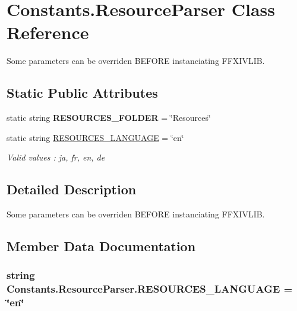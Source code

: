 \hypertarget{class_constants_1_1_resource_parser}{\section{Constants.\-Resource\-Parser Class Reference}
\label{class_constants_1_1_resource_parser}
}


Some parameters can be overriden B\-E\-F\-O\-R\-E instanciating F\-F\-X\-I\-V\-L\-I\-B.  


\subsection*{Static Public Attributes}
\begin{DoxyCompactItemize}
\item 
\hypertarget{class_constants_1_1_resource_parser_ac3c9afd0c2716bc70ee1f601d0571ada}{static string {\bfseries R\-E\-S\-O\-U\-R\-C\-E\-S\-\_\-\-F\-O\-L\-D\-E\-R} = \char`\"{}Resources\char`\"{}}\label{class_constants_1_1_resource_parser_ac3c9afd0c2716bc70ee1f601d0571ada}

\item 
static string \hyperlink{class_constants_1_1_resource_parser_abf474d6b34a4842c5893abfcb1c3e897}{R\-E\-S\-O\-U\-R\-C\-E\-S\-\_\-\-L\-A\-N\-G\-U\-A\-G\-E} = \char`\"{}en\char`\"{}
\begin{DoxyCompactList}\small\item\em Valid values \-: ja, fr, en, de \end{DoxyCompactList}\end{DoxyCompactItemize}


\subsection{Detailed Description}
Some parameters can be overriden B\-E\-F\-O\-R\-E instanciating F\-F\-X\-I\-V\-L\-I\-B. 



\subsection{Member Data Documentation}
\hypertarget{class_constants_1_1_resource_parser_abf474d6b34a4842c5893abfcb1c3e897}{
\subsubsection[{R\-E\-S\-O\-U\-R\-C\-E\-S\-\_\-\-L\-A\-N\-G\-U\-A\-G\-E}]{\setlength{\rightskip}{0pt plus 5cm}string Constants.\-Resource\-Parser.\-R\-E\-S\-O\-U\-R\-C\-E\-S\-\_\-\-L\-A\-N\-G\-U\-A\-G\-E = \char`\"{}en\char`\"{}\hspace{0.3cm}{\ttfamily [static]}}}\label{class_constants_1_1_resource_parser_abf474d6b34a4842c5893abfcb1c3e897}


